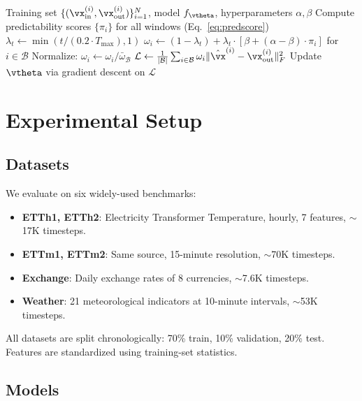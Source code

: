 \documentclass[10pt]{article}
\newcommand{\pwt}{\textsc{PWT}}
\newcommand{\predscore}{\pi}
\begin{document}
\begin{algorithm}[t]
\caption{Predictability-Weighted Training (\pwt{})}
\label{alg:pwt}
\begin{algorithmic}[1]
\REQUIRE Training set $\{(\vx^{(i)}_{\text{in}}, \vx^{(i)}_{\text{out}})\}_{i=1}^N$, model $f_\vtheta$, hyperparameters $\alpha, \beta$
\STATE Compute predictability scores $\{\predscore_i\}$ for all windows (Eq.~\ref{eq:predscore})
    \STATE $\lambda_t \gets \min(t / (0.2 \cdot T_{\max}), 1)$
        \STATE $\omega_i \gets (1-\lambda_t) + \lambda_t \cdot [\beta + (\alpha-\beta) \cdot \predscore_i]$ for $i \in \mathcal{B}$
        \STATE Normalize: $\omega_i \gets \omega_i / \bar{\omega}_\mathcal{B}$
        \STATE $\mathcal{L} \gets \frac{1}{|\mathcal{B}|} \sum_{i \in \mathcal{B}} \omega_i \|\hat{\vx}^{(i)} - \vx^{(i)}_{\text{out}}\|^2_F$
        \STATE Update $\vtheta$ via gradient descent on $\mathcal{L}$
    \ENDFOR
\ENDFOR
\end{algorithmic}
\end{algorithm}

\section{Experimental Setup}
\label{sec:experiments}

\subsection{Datasets}

We evaluate on six widely-used benchmarks:
\begin{itemize}
    \item \textbf{ETTh1, ETTh2}: Electricity Transformer Temperature, hourly, 7 features, $\sim$17K timesteps.
    \item \textbf{ETTm1, ETTm2}: Same source, 15-minute resolution, $\sim$70K timesteps.
    \item \textbf{Exchange}: Daily exchange rates of 8 currencies, $\sim$7.6K timesteps.
    \item \textbf{Weather}: 21 meteorological indicators at 10-minute intervals, $\sim$53K timesteps.
\end{itemize}

All datasets are split chronologically: 70\% train, 10\% validation, 20\% test. Features are standardized using training-set statistics.

\subsection{Models}
\end{document}
